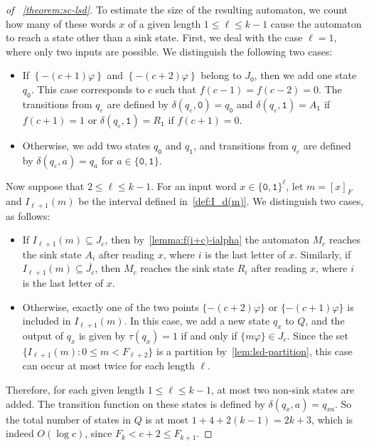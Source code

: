 \documentclass[12pt,runningheads]{llncs}
\newcommand{\tO}{\mathtt{0}}
\newcommand{\tL}{\mathtt{1}}
\renewcommand{\phi}{\varphi}
\newcommand{\fract}[1]{\left\{ #1 \right\}}
\begin{document}
\begin{proof}[of ~\cref{theorem:sc-lsd}]
To estimate the size of the resulting automaton, we count how many of these words $x$ of a given length $1\leq \ell \leq k-1$ cause the automaton to reach a state other than a sink state. 
First, we deal with the case $\ell=1$, where only two inputs are possible. We distinguish the following two cases:
\begin{itemize}

\item If $\fract{-(c+1)\phi}$ and $\fract{-(c+2)\phi}$ belong to $J_0$, then we add one state $q_\tO$. This case corresponds to $c$ such that $f(c-1)=f(c-2)=0$. The transitions from $q_\varepsilon$ are defined by $\delta(q_\varepsilon,\tO)=q_\tO$ and $\delta(q_\varepsilon,\tL)=A_\tL$ if $f(c+1)=1$ or $\delta(q_\varepsilon,\tL)=R_\tL$ if $f(c+1)=0$. 

\item Otherwise, we add two states $q_\tO$ and $q_\tL$, and transitions from $q_\varepsilon$ are defined by $\delta(q_\varepsilon,a)=q_a$ for $a\in \{\tO,\tL\}$. 
\end{itemize}
Now suppose that $2 \leq \ell \leq k-1$. 
For an input word $x\in \{\tO,\tL\}^\ell$,
let $m=[x]_F$ and $I_{\ell + 1}(m)$ be the interval defined in~\cref{def:I_d(m)}. 
We distinguish two cases, as follows: 
\begin{itemize}
\item If $I_{\ell + 1}(m) \subseteq J_c$, then by~\cref{lemma:f(i+c)-ialpha} the automaton $M_c$ reaches the sink state $A_i$ after reading $x$, where $i$ is the last letter of $x$. Similarly, if $I_{\ell + 1}(m) \subseteq \overline{J_c}$, then  $M_c$ reaches the sink state $R_i$ after reading $x$, where $i$ is the last letter of $x$.

\item Otherwise, exactly one of the two points $\{-(c+2)\phi\}$ or $\{-(c+1)\phi\}$ is included in $I_{\ell + 1}(m)$. In this case, we add a new state $q_x$ to $Q$, and the output of $q_x$ is given by $\tau(q_x) = 1$ if and only if $\{m\phi\} \in J_c$. Since the set $\{I_{\ell + 1}(m)\colon 0\leq m < F_{\ell + 2}\}$ is a partition by~\cref{lem:lsd-partition}, this case can occur at most twice for each length $\ell$. 
\end{itemize} 

Therefore, for each given length $1\leq \ell \leq k-1$, at most two non-sink states are added. The transition function on these states is defined by $\delta(q_x,a)=q_{xa}$.  So the total number of states in $Q$ is at most $1 + 4 + 2(k-1) = 2k + 3$, which is indeed $O(\log c)$, since $F_k < c+2 \leq F_{k+1}$. 


\end{proof}
\end{document}
